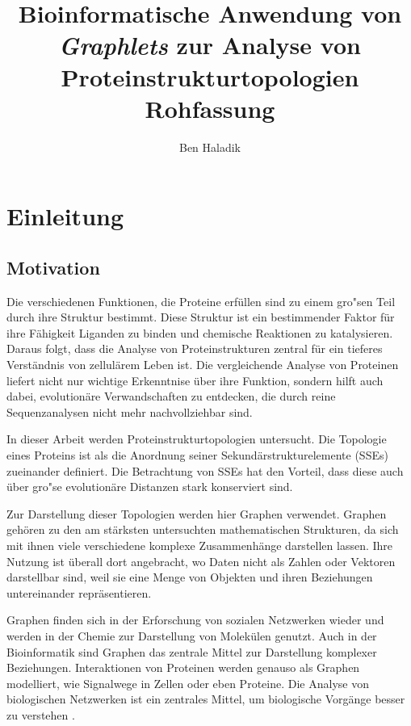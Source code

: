 \documentclass{report}
\author{Ben Haladik}
\title{Bioinformatische Anwendung von \textit{Graphlets} zur Analyse von Proteinstrukturtopologien \\ Rohfassung}
\begin{document}


\maketitle

\newpage

\tableofcontents

\newpage

\listoffigures

\newpage

\listoftables

\newpage

\chapter{Einleitung}

\section{Motivation}


Die verschiedenen Funktionen, die Proteine erf\"ullen sind zu einem gro"sen Teil durch ihre Struktur bestimmt. Diese Struktur ist ein bestimmender Faktor f\"ur ihre F\"ahigkeit Liganden zu binden und chemische Reaktionen zu katalysieren.
Daraus folgt, dass die Analyse von Proteinstrukturen zentral f\"ur ein tieferes Verst\"andnis von zellul\"arem Leben ist. Die vergleichende Analyse von Proteinen liefert nicht nur wichtige Erkenntnise \"uber ihre Funktion, sondern hilft auch dabei, evolution\"are Verwandschaften zu entdecken, die durch reine Sequenzanalysen nicht mehr nachvollziehbar sind.

In dieser Arbeit werden Proteinstrukturtopologien untersucht. Die Topologie eines Proteins ist als die Anordnung seiner Sekund\"arstrukturelemente (SSEs) zueinander definiert. Die Betrachtung von SSEs hat den Vorteil, dass diese auch \"uber gro"se evolution\"are Distanzen stark konserviert sind. 

Zur Darstellung dieser Topologien werden hier Graphen verwendet. Graphen geh\"oren zu den am st\"arksten untersuchten mathematischen Strukturen, da sich mit ihnen viele verschiedene komplexe Zusammenh\"ange darstellen lassen. Ihre Nutzung ist \"uberall dort angebracht, wo Daten nicht als Zahlen oder Vektoren darstellbar sind, weil sie eine Menge von Objekten und ihren Beziehungen untereinander repr\"asentieren.


Graphen finden sich in der Erforschung von sozialen Netzwerken wieder und werden in der Chemie zur Darstellung von Molek\"ulen genutzt. Auch in der Bioinformatik sind Graphen das zentrale Mittel zur Darstellung komplexer Beziehungen. Interaktionen von Proteinen werden genauso als Graphen modelliert, wie Signalwege in Zellen oder eben Proteine. Die Analyse von biologischen Netzwerken ist ein zentrales Mittel, um biologische Vorg\"ange besser zu verstehen \cite{junker2011analysis}.
\end{document}
